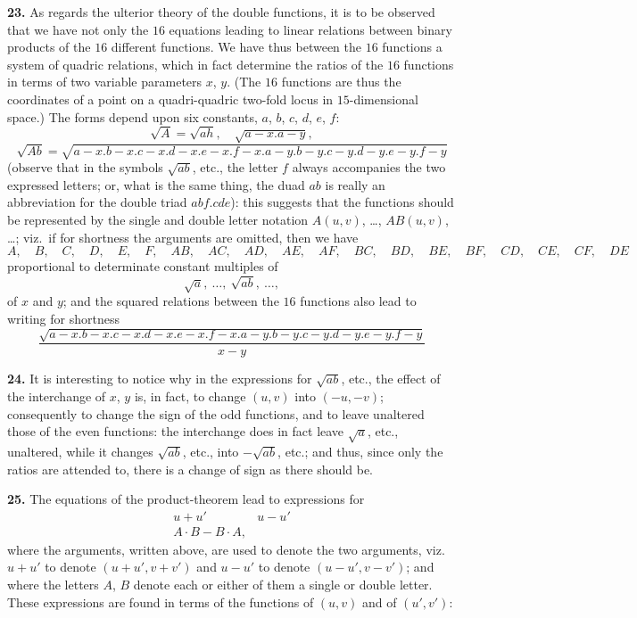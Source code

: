 \documentclass[11pt,a4paper]{book}
\begin{document}
\vspace{0.5em}

\noindent\textbf{23.}\quad
As regards the ulterior theory of the double functions, it is to be observed that we have not only the $16$ equations leading to linear relations between binary products of the $16$ different functions. We have thus between the $16$ functions a system of quadric relations, which in fact determine the ratios of the $16$ functions in terms of two variable parameters $x$, $y$. (The $16$ functions are thus the coordinates of a point on a quadri-quadric two-fold locus in $15$-dimensional space.) The forms depend upon six constants, $a$, $b$, $c$, $d$, $e$, $f$:
\[
\sqrt{A} = \sqrt{ah}, \quad \sqrt{a - x . a - y},
\]
\[
\sqrt{Ab} = \sqrt{a - x . b - x . c - x . d - x . e - x . f - x . a - y . b - y . c - y . d - y . e - y . f - y}
\]
(observe that in the symbols $\sqrt{ab}$, etc., the letter $f$ always accompanies the two expressed letters; or, what is the same thing, the duad $ab$ is really an abbreviation for the double triad $abf.cde$): this suggests that the functions should be represented by the single and double letter notation $A(u, v)$, \dots, $AB(u, v)$, \dots; viz.\ if for shortness the arguments are omitted, then we have
\[
A,\quad B,\quad C,\quad D,\quad E,\quad F,\quad AB,\quad AC,\quad AD,\quad AE,\quad AF,\quad BC,\quad BD,\quad BE,\quad BF,\quad CD,\quad CE,\quad CF,\quad DE
\]
proportional to determinate constant multiples of
\[
\sqrt{a},\ \dots,\ \sqrt{ab},\ \dots,
\]
of $x$ and $y$; and the squared relations between the $16$ functions also lead to writing for shortness
\[
\frac{\sqrt{a - x . b - x . c - x . d - x . e - x . f - x . a - y . b - y . c - y . d - y . e - y . f - y}}{x - y}
\]

\noindent\textbf{24.}\quad
It is interesting to notice why in the expressions for $\sqrt{ab}$, etc., the effect of the interchange of $x$, $y$ is, in fact, to change $(u, v)$ into $(-u, -v)$; consequently to change the sign of the odd functions, and to leave unaltered those of the even functions: the interchange does in fact leave $\sqrt{a}$, etc., unaltered, while it changes $\sqrt{ab}$, etc., into $-\sqrt{ab}$, etc.; and thus, since only the ratios are attended to, there is a change of sign as there should be.

\noindent\textbf{25.}\quad
The equations of the product-theorem lead to expressions for
\[
\begin{matrix} u + u' & u - u' \\ A \cdot B - B \cdot A, \end{matrix}
\]
where the arguments, written above, are used to denote the two arguments, viz.\ $u + u'$ to denote $(u + u', v + v')$ and $u - u'$ to denote $(u - u', v - v')$; and where the letters $A$, $B$ denote each or either of them a single or double letter. These expressions are found in terms of the functions of $(u, v)$ and of $(u', v')$:
\end{document}
